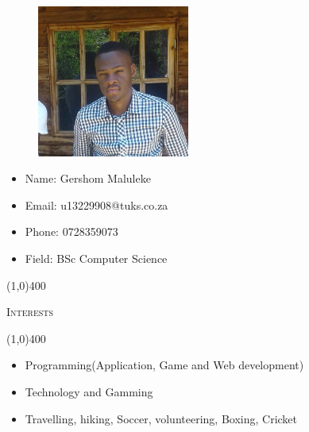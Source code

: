 \documentclass[12pt,a4paper]{report}
\begin{document}
\newpage
\vspace*{-3cm}\
\begin{minipage}{0.5\textwidth}
\begin{figure}[H]
\includegraphics[width=5cm,height=5cm,keepaspectratio]{u13229908.jpg}
\end{figure}
\end{minipage} \hfill
\begin{minipage}{0.6\textwidth}
\begin{itemize}
\item[] Name: Gershom Maluleke
\item[] Email: u13229908@tuks.co.za
\item[] Phone: 0728359073
\item[] Field: BSc Computer Science
\end{itemize}
\end{minipage}

\begin{center}
	
	\line(1,0){400}\\
	{\scshape\large Interests\par}
	\line(1,0){400}\\
	\end{center}
	\begin{itemize}
\item Programming(Application, Game and Web development)    
\item Technology and Gamming
\item  Travelling, hiking, Soccer, volunteering, Boxing, Cricket

\end{itemize}
	
\end{document}
